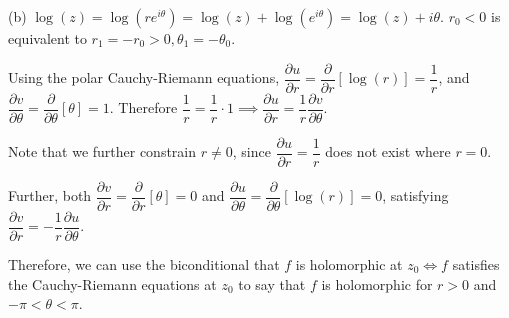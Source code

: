 \documentclass{article}
\begin{document}
(b) $\log(z) = \log(re^{i\theta}) = \log(z) + \log(e^{i\theta}) = \log(z) + i\theta$. 
$r_0 <0$ is equivalent to $r_1 = -r_0 > 0, \theta_1 = -\theta_0$. 

Using the polar Cauchy-Riemann equations, $\dfrac{\partial u}{\partial r} = \dfrac{\partial }{\partial r}[\log(r)] = \dfrac{1}{r}$, and $\dfrac{\partial v}{\partial \theta} = \dfrac{\partial }{\partial \theta}[\theta] = 1$. Therefore $\dfrac{1}{r} = \dfrac{1}{r}\cdot 1 \implies \dfrac{\partial u}{\partial r} = \dfrac{1}{r}\dfrac{\partial v}{\partial \theta}$. 

Note that we further constrain $r \neq 0$, since $\dfrac{\partial u}{\partial r} = \dfrac{1}{r}$ does not exist where $r = 0$.

Further, both $\dfrac{\partial v}{\partial r} = \dfrac{\partial }{\partial r}[\theta] = 0$ and $\dfrac{\partial u}{\partial \theta} = \dfrac{\partial }{\partial \theta}[\log(r)] = 0$, satisfying $\dfrac{\partial v}{\partial r} = -\dfrac{1}{r}\dfrac{\partial u}{\partial \theta}$. 

Therefore, we can use the biconditional that $f$ is holomorphic at $z_0 \iff f$ satisfies the Cauchy-Riemann equations at $z_0$ to say that $f$ is holomorphic for $r > 0$ and $-\pi < \theta < \pi$. 
\end{document}
